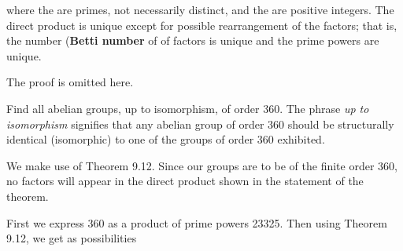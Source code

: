 \documentclass[11pt,oneside]{article}
\begin{document}
\begin{BookBody}
\noindent where the  are primes, not necessarily distinct, and the  are positive integers. The direct product is unique except for possible rearrangement of the factors; that is, the number (\textbf{Betti number} of  of factors  is unique and the prime powers  are unique.

 The proof is omitted here. \BookEnd{\blacklozenge}

 Find all abelian groups, up to isomorphism, of order 360. The phrase\textit{ up to isomorphism} signifies that any abelian group of order 360 should be structurally identical (isomorphic) to one of the groups of order 360 exhibited.

 We make use of Theorem 9.12. Since our groups are to be of the finite order 360, no factors  will appear in the direct product shown in the statement of the theorem.

First we express 360 as a product of prime powers 23325. Then using Theorem 9.12, we get as possibilities




\end{BookBody}

\BookNarrativetrue
\end{document}
